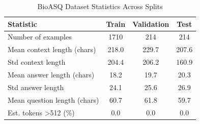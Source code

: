 
\begin{table}[htbp]
\centering
\caption{BioASQ Dataset Statistics Across Splits}
\label{tab:dataset-statistics}
\begin{tabular}{lccc}
\hline
\textbf{Statistic} & \textbf{Train} & \textbf{Validation} & \textbf{Test} \\
\hline
Number of examples & 1710 & 214 & 214 \\
Mean context length (chars) & 218.0 & 229.7 & 207.6 \\
Std context length & 204.4 & 206.2 & 160.9 \\
Mean answer length (chars) & 18.2 & 19.7 & 20.3 \\
Std answer length & 24.1 & 25.6 & 26.9 \\
Mean question length (chars) & 60.7 & 61.8 & 59.7 \\
Est. tokens >512 (\%) & 0.0 & 0.0 & 0.0 \\
\hline
\end{tabular}
\end{table}
